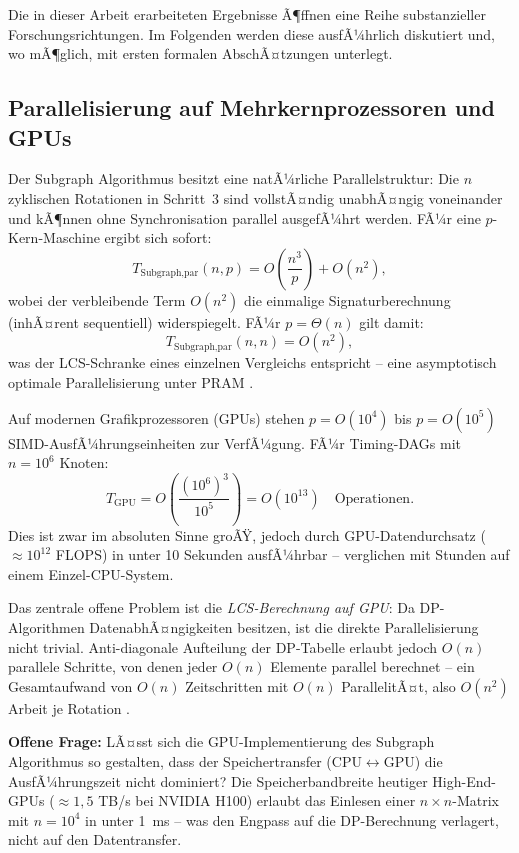 ﻿\documentclass[a4paper,12pt]{article}
\theoremstyle{definition}
\begin{document}
Die in dieser Arbeit erarbeiteten Ergebnisse Ã¶ffnen eine Reihe substanzieller
Forschungsrichtungen. Im Folgenden werden diese ausfÃ¼hrlich diskutiert und, wo mÃ¶glich,
mit ersten formalen AbschÃ¤tzungen unterlegt.

\subsection{Parallelisierung auf Mehrkernprozessoren und GPUs}

Der Subgraph Algorithmus besitzt eine natÃ¼rliche Parallelstruktur: Die $n$ zyklischen
Rotationen in Schritt~3 sind vollstÃ¤ndig unabhÃ¤ngig voneinander und kÃ¶nnen ohne
Synchronisation parallel ausgefÃ¼hrt werden. FÃ¼r eine $p$-Kern-Maschine ergibt sich
sofort:
\[
  T_{\text{Subgraph,par}}(n, p) = O\!\left(\frac{n^3}{p}\right) + O(n^2),
\]
wobei der verbleibende Term $O(n^2)$ die einmalige Signaturberechnung (inhÃ¤rent
sequentiell) widerspiegelt. FÃ¼r $p = \Theta(n)$ gilt damit:
\[
  T_{\text{Subgraph,par}}(n, n) = O(n^2),
\]
was der LCS-Schranke eines einzelnen Vergleichs entspricht -- eine asymptotisch optimale
Parallelisierung unter PRAM \cite{jaja1992introduction}.

Auf modernen Grafikprozessoren (GPUs) stehen $p = O(10^4)$ bis $p = O(10^5)$
SIMD-AusfÃ¼hrungseinheiten zur VerfÃ¼gung. FÃ¼r Timing-DAGs mit $n = 10^6$ Knoten:
\[
  T_{\text{GPU}} = O\!\left(\frac{(10^6)^3}{10^5}\right) = O(10^{13})
  \quad \text{Operationen.}
\]
Dies ist zwar im absoluten Sinne groÃŸ, jedoch durch GPU-Datendurchsatz
($\approx 10^{12}$ FLOPS) in unter 10 Sekunden ausfÃ¼hrbar -- verglichen mit Stunden
auf einem Einzel-CPU-System.

Das zentrale offene Problem ist die \emph{LCS-Berechnung auf GPU}: Da DP-Algorithmen
DatenabhÃ¤ngigkeiten besitzen, ist die direkte Parallelisierung nicht trivial. Anti-diagonale
Aufteilung der DP-Tabelle erlaubt jedoch $O(n)$ parallele Schritte, von denen jeder
$O(n)$ Elemente parallel berechnet -- ein Gesamtaufwand von $O(n)$ Zeitschritten mit
$O(n)$ ParallelitÃ¤t, also $O(n^2)$ Arbeit je Rotation \cite{allison1986lcs}.

\textbf{Offene Frage:} LÃ¤sst sich die GPU-Implementierung des Subgraph Algorithmus
so gestalten, dass der Speichertransfer (CPU$\leftrightarrow$GPU) die AusfÃ¼hrungszeit
nicht dominiert? Die Speicherbandbreite heutiger High-End-GPUs ($\approx 1{,}5$ TB/s
bei NVIDIA H100) erlaubt das Einlesen einer $n \times n$-Matrix mit $n = 10^4$ in unter
1~ms -- was den Engpass auf die DP-Berechnung verlagert, nicht auf den Datentransfer.
\end{document}
